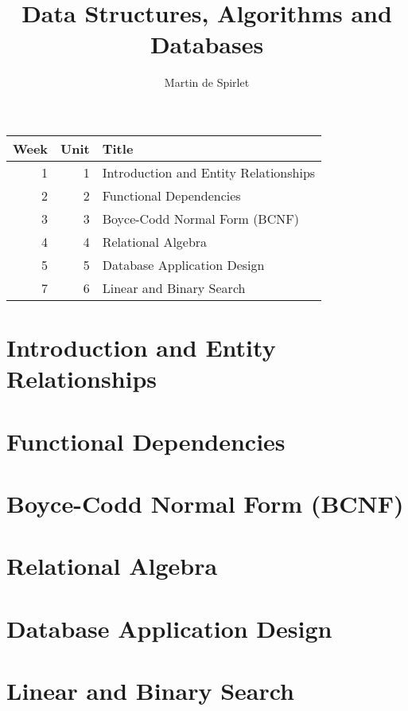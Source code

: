 \documentclass[
  11pt,
  a4paper,
]{article}
\title{Data Structures, Algorithms and Databases}
\author{Martin de Spirlet}
\date{}
\begin{document}

\maketitle

\vspace*{\fill}

\begin{table}[htp]
  \centering
  \begin{tabular}{rrl}
    \toprule
    Week & Unit & Title \\
    \midrule
    1 & 1 & Introduction and Entity Relationships \\
    2 & 2 & Functional Dependencies \\
    3 & 3 & Boyce-Codd Normal Form (BCNF) \\
    4 & 4 & Relational Algebra \\
    5 & 5 & Database Application Design \\
    7 & 6 & Linear and Binary Search \\
    \bottomrule
  \end{tabular}
\end{table}

\vspace*{\fill}
\addvspace{1in}

\clearpage


\section{Introduction and Entity Relationships}


\section{Functional Dependencies}


\section{Boyce-Codd Normal Form (BCNF)}


\section{Relational Algebra}


\section{Database Application Design}


\section{Linear and Binary Search}

\end{document}
